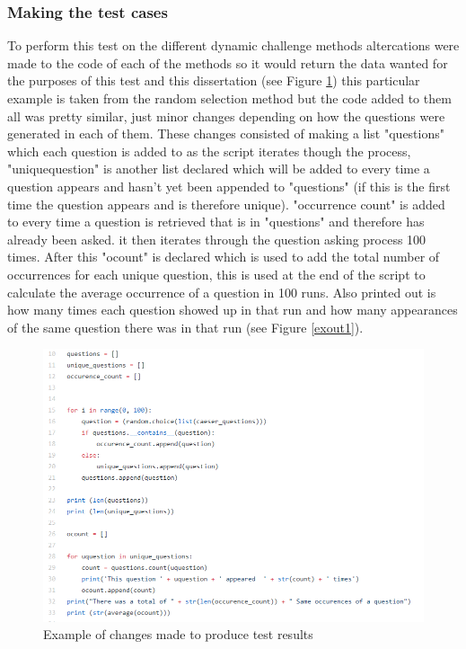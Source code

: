 \documentclass[12pt,a4paper]{article}
\begin{document}
\subsubsection{Making the test cases} 
To perform this test on the different dynamic challenge methods altercations were made to the code of each of the methods so it would return the data wanted for the purposes of this test and this dissertation (see Figure \ref{testcases}) this particular example is taken from the random selection method but the code added to them all was pretty similar, just minor changes depending on how the questions were generated in each of them. These changes consisted of making a list "questions" which each question is added to as the script iterates though the process, "unique\textunderscore question" is another list declared which will be added to every time a question appears and hasn't yet been appended to "questions" (if this is the first time the question appears and is therefore unique). "occurrence \textunderscore count" is added to every time a question is retrieved that is in "questions" and therefore has already been asked. it then iterates through the question asking process 100 times. After this "ocount" is declared which is used to add the total number of occurrences for each unique question, this is used at the end of the script to calculate the average occurrence of a question in 100 runs. Also printed out is how many times each question showed up in that run and how many appearances of the same question there was in that run (see Figure \ref{exout1}).

\begin{figure}[!ht]
    \centering
    \includegraphics[width=1.0\textwidth]{Figs/testcases.PNG} 
    \caption{Example of changes made to produce test results} 
    \label{testcases}
\end{figure} 
\end{document}
